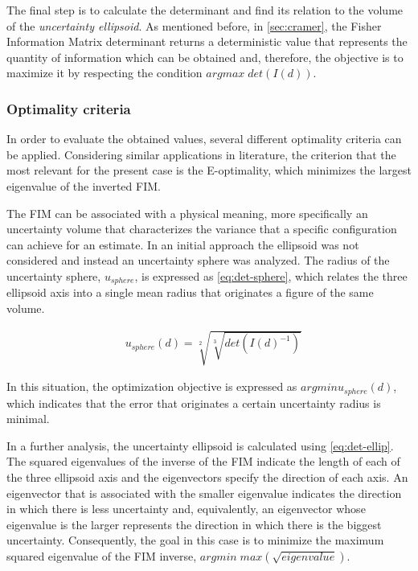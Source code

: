 The final step is to calculate the determinant and find its relation to the volume of the \textit{uncertainty ellipsoid}. As mentioned before, in \ref{sec:cramer}, the Fisher Information Matrix determinant returns a deterministic value that represents the quantity of information which can be obtained and, therefore, the objective is to maximize it by respecting the condition $argmax \; det(I(d))$.

\subsubsection{Optimality criteria}

In order to evaluate the obtained values, several different optimality criteria can be applied. Considering similar applications in literature, the criterion that  the most relevant for the present case is the E-optimality, which minimizes the largest eigenvalue of the inverted FIM.

The FIM can be associated with a physical meaning, more specifically an uncertainty volume that characterizes the variance that a specific configuration can achieve for an estimate. In an initial approach the ellipsoid was not considered and instead an uncertainty sphere was analyzed. The radius of the uncertainty sphere, $u_{sphere}$, is expressed as \ref{eq:det-sphere}, which relates the three ellipsoid axis into a single mean radius that originates a figure of the same volume.

\begin{eqnarray}
	& u_{sphere}(d) = \sqrt[2]{\sqrt[3]{det(I(d)^{-1})}}
	\label{eq:det-sphere}
\end{eqnarray}

In this situation, the optimization objective is expressed as $argmin u_{sphere}(d)$, which indicates that the error that originates a certain uncertainty radius is minimal.

In a further analysis, the uncertainty ellipsoid is calculated using \ref{eq:det-ellip}. The squared eigenvalues of the inverse of the FIM indicate the length of each of the three ellipsoid axis and the eigenvectors specify the direction of each axis. An eigenvector that is associated with the smaller eigenvalue indicates the direction in which there is less uncertainty and, equivalently, an eigenvector whose eigenvalue is the larger represents the direction in which there is the biggest uncertainty. Consequently, the goal in this case is to minimize the maximum squared eigenvalue of the FIM inverse, $argmin \; max(\sqrt{eigenvalue})$.

